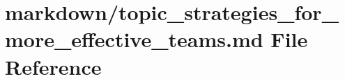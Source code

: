 \hypertarget{topic__strategies__for__more__effective__teams_8md}{}\section{markdown/topic\+\_\+strategies\+\_\+for\+\_\+more\+\_\+effective\+\_\+teams.md File Reference}
\label{topic__strategies__for__more__effective__teams_8md}
